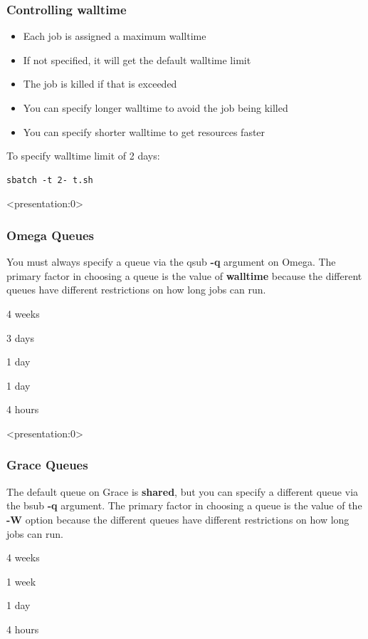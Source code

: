 \documentclass[10pt]{beamer}
\begin{document}
\begin{frame}[fragile]
\frametitle{Controlling walltime}
\begin{itemize}
\item Each job is assigned a maximum walltime
\item If not specified, it will get the default walltime limit
\item The job is killed if that is exceeded
\item You can specify longer walltime to avoid the job being killed
\item You can specify shorter walltime to get resources faster
\end{itemize}

To specify walltime limit of 2 days:
\begin{verbatim}
sbatch -t 2- t.sh

\end{verbatim}
\end{frame}

\begin{frame}<presentation:0>
\frametitle{Omega Queues}
You must always specify a queue via the qsub \textbf{-q} argument on
Omega.  The primary factor in choosing a queue is the value of
\textbf{walltime} because the different queues have different
restrictions on how long jobs can run.

\vskip10pt
\begin{description}
\item[fas\_very\_long]       4 weeks
\item[fas\_long]             3 days
\item[fas\_high]             1 day
\item[fas\_normal]           1 day
\item[fas\_devel]            4 hours
\end{description}

\end{frame}

\begin{frame}<presentation:0>
\frametitle{Grace Queues}
The default queue on Grace is \textbf{shared}, but you can specify
a different queue via the bsub \textbf{-q} argument.
The primary factor in choosing a queue is the value of the \textbf{-W}
option because the different queues have different restrictions on how
long jobs can run.

\vskip10pt
\begin{description}[interactive]
\item[long]                  4 weeks
\item[week]                  1 week
\item[shared]                1 day
\item[interactive]           4 hours
\end{description}

\end{frame}
\end{document}
